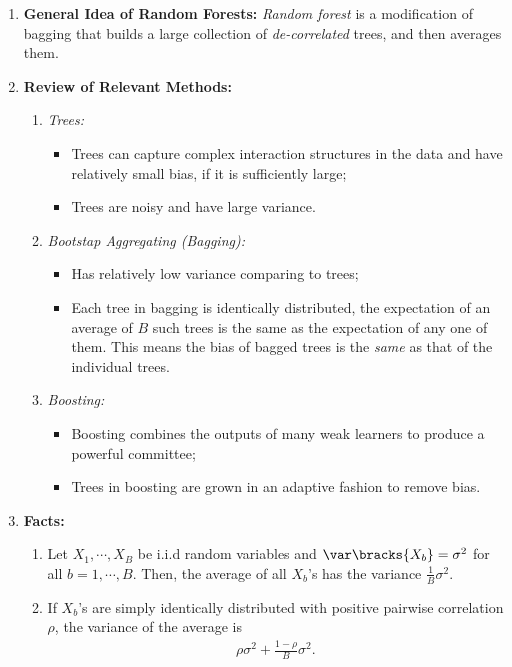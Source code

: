 \documentclass[12pt]{article}
\begin{document}
\begin{enumerate}[label=\textbf{\arabic*.}]
	
	\item \textbf{General Idea of Random Forests:} \textit{Random forest} is a modification of bagging that builds a large collection of \textit{de-correlated} trees, and then averages them. 
	
	\item \textbf{Review of Relevant Methods:} 
	\begin{enumerate}
		\item \textit{Trees:} 
		\begin{itemize}
			\item Trees can capture complex interaction structures in the data and have relatively small bias, if it is sufficiently large; 
			\item Trees are noisy and have large variance. 
		\end{itemize}
		
		\item \textit{Bootstap Aggregating (Bagging):} 
		\begin{itemize}
			\item Has relatively low variance comparing to trees; 
			\item Each tree in bagging is identically distributed, the expectation of an average of $B$ such trees is the same as the expectation of any one of them. This means the bias of bagged trees is the \emph{same} as that of the individual trees. 
		\end{itemize}
		
		\item \textit{Boosting:} 
		\begin{itemize}
			\item Boosting combines the outputs of many weak learners to produce a powerful committee; 
			\item Trees in boosting are grown in an adaptive fashion to remove bias. 
		\end{itemize}
	\end{enumerate}
	
	\item \textbf{Facts:} 
	\begin{enumerate}
		\item Let $X_1, \cdots, X_B$ be i.i.d random variables and $\var \bracks{X_b} = \sigma^2$ for all $b = 1, \cdots, B$. Then, the average of all $X_b$'s has the variance $\frac{1}{B} \sigma^2$. 
		\item If $X_b$'s are simply identically distributed with positive pairwise correlation $\rho$, the variance of the average is 
		\begin{align}\label{corr.B}
			\rho \sigma^2 + \frac{1-\rho}{B} \sigma^2. 
		\end{align}
	\end{enumerate}
	

\end{enumerate}
\end{document}
